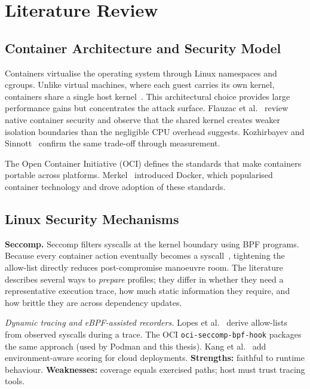 
\chapter{Literature Review}\label{ch:litreview}

\section{Container Architecture and Security Model}

Containers virtualise the operating system through Linux namespaces and cgroups. Unlike virtual machines, where each guest carries its own kernel, containers share a single host kernel~\cite{wang2023}. This architectural choice provides large performance gains but concentrates the attack surface. Flauzac et al.~\cite{flauzac2020} review native container security and observe that the shared kernel creates weaker isolation boundaries than the negligible CPU overhead suggests. Kozhirbayev and Sinnott~\cite{kozhirbayev2017} confirm the same trade-off through measurement.

The Open Container Initiative (OCI) defines the standards that make containers portable across platforms. Merkel~\cite{merkel2014} introduced Docker, which popularised container technology and drove adoption of these standards.

\section{Linux Security Mechanisms}

\textbf{Seccomp.} Seccomp filters syscalls at the kernel boundary using BPF programs. Because every container action eventually becomes a syscall~\cite{jajoo2025syscalls}, tightening the allow-list directly reduces post-compromise manoeuvre room. The literature describes several ways to \emph{prepare} profiles; they differ in whether they need a representative execution trace, how much static information they require, and how brittle they are across dependency updates.

\emph{Dynamic tracing and eBPF-assisted recorders.} Lopes et al.~\cite{lopes2020} derive allow-lists from observed syscalls during a trace. The OCI \texttt{oci-seccomp-bpf-hook} packages the same approach (used by Podman and this thesis). Kang et al.~\cite{kang2026beacon} add environment-aware scoring for cloud deployments. \textbf{Strengths:} faithful to runtime behaviour. \textbf{Weaknesses:} coverage equals exercised paths; host must trust tracing tools.


